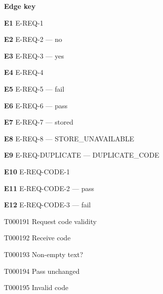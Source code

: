 \documentclass[11pt,a4paper]{article}
\begin{document}
\noindent\textbf{Edge key}\par
\begingroup\small\raggedright\setlength{\parskip}{1pt}
\noindent\textbf{E1} E-REQ-1\par
\noindent\textbf{E2} E-REQ-2 --- no\par
\noindent\textbf{E3} E-REQ-3 --- yes\par
\noindent\textbf{E4} E-REQ-4\par
\noindent\textbf{E5} E-REQ-5 --- fail\par
\noindent\textbf{E6} E-REQ-6 --- pass\par
\noindent\textbf{E7} E-REQ-7 --- stored\par
\noindent\textbf{E8} E-REQ-8 --- STORE\_UNAVAILABLE\par
\noindent\textbf{E9} E-REQ-DUPLICATE --- DUPLICATE\_CODE\par
\noindent\textbf{E10} E-REQ-CODE-1\par
\noindent\textbf{E11} E-REQ-CODE-2 --- pass\par
\noindent\textbf{E12} E-REQ-CODE-3 --- fail\par
\endgroup
\clearpage
\begin{atlastext}{T000191}
Request code validity
\end{atlastext}
\begin{atlastext}{T000192}
Receive code
\end{atlastext}
\begin{atlastext}{T000193}
Non-empty text?
\end{atlastext}
\begin{atlastext}{T000194}
Pass unchanged
\end{atlastext}
\begin{atlastext}{T000195}
Invalid code
\end{atlastext}
\end{document}
